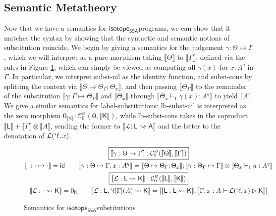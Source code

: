 \documentclass[acmsmall,screen,review]{acmart}
\newcommand{\mc}[1]{\ensuremath{\mathcal{#1}}}
\newcommand{\mb}[1]{\ensuremath{\mathbf{#1}}}
\newcommand{\ms}[1]{\ensuremath{\mathsf{#1}}}
\newcommand{\lbl}[1]{{`#1}}
\newcommand{\csplits}[3]{#1 \mapsto #2;#3}
\newcommand{\thyp}[3]{#1: {#2}^{#3}}
\newcommand{\lhyp}[3]{#1[#2](#3)}
\newcommand{\llhyp}[3]{\lhyp{\lbl{#1}}{#2}{#3}}
\newcommand{\rle}[1]{{\scriptsize\textsf{#1}}}
\newcommand{\hasty}[5]{#1 \vdash_{#2} #3: {#4}^{#5}}
\newcommand{\haslb}[3]{#1 \vdash #2 \rhd #3}
\newcommand{\issubst}[3]{#1: #2 \mapsto #3}
\newcommand{\lbsubst}[3]{#1: #2 \rightsquigarrow #3}
\newcommand{\dnt}[1]{\llbracket{#1}\rrbracket}
\newcommand{\isotopessa}{\ms{isotope_{SSA}}}
\begin{document}
\subsection{Semantic Metatheory}

Now that we have a semantics for \isotopessa programs, we can show that it
matches the syntax by showing that the syntactic and semantic notions of
substitution coincide. We begin by giving a semantics for the judgement
\(\issubst{\gamma}{\Theta}{\Gamma}\), which we will interpret as a pure morphism
taking \(\dnt{\Theta}\) to \(\dnt{\Gamma}\), defined via the rules in Figure
\ref{fig:ssa-subst-semantics}, which can simply be viewed as computing all
\(\gamma(x)\) for \(\thyp{x}{A}{q}\) in \(\Gamma\). In particular, we interpret
\rle{subst-nil} as the identity function, and \rle{subst-cons} by splitting the
context via \(\dnt{\csplits{\Theta}{\Theta_\Gamma}{\Theta_x}}\), and then
passing \(\dnt{\Theta_\Gamma}\) to the remainder of the substitution
\(\dnt{\issubst{\gamma}{\Gamma}{\Theta_\Gamma}}\) and \(\dnt{\Theta_x}\) through
\(\dnt{\hasty{\Theta_x}{1}{\gamma(x)}{A}{q}}\) to yield \(\dnt{A}\). We give a
similar semantics for label-substitutions: \rle{lb-subst-nil} is interpreted as
the zero morphism \(0_{\dnt{\ms{K}}}: \mc{C}_0^\varnothing(\mb{0},
\dnt{\ms{K}})\), while \rle{lb-subst-cons} takes in the coproduct \(\dnt{\ms{L}}
+ \dnt{\Gamma} \otimes \dnt{A}\), sending the former to
\(\dnt{\lbsubst{\mc{L}}{\ms{L}}{\ms{A}}}\) and the latter to the denotation of
\(\mc{L}(\lbl{\ell}, x)\).

\begin{figure}
  \begin{gather*}
    \boxed{\dnt{\issubst{\gamma}{\Theta}{\Gamma}}: \mc{C}_1^\varnothing(\dnt{\Theta}, \dnt{\Gamma})} 
    \\
    \dnt{\issubst{\cdot}{\cdot}{\cdot}} = \ms{id}
    \qquad
    \dnt{\issubst{\gamma}{\Theta}{\Gamma, \thyp{x}{A}{q}}}
      = \dnt{\csplits{\Theta}{\Theta_\Gamma}{\Theta_x}};\dnt{\issubst{\gamma}{\Theta_\Gamma}{\Gamma}} \otimes \dnt{\hasty{\Theta_x}{1}{a}{A}{q}}
    \\
    \boxed{\dnt{\lbsubst{\mc{L}}{\ms{L}}{\ms{K}}}: \mc{C}_0^\varnothing(\dnt{\ms{L}}, \dnt{\ms{K}})} 
    \\
    \dnt{\lbsubst{\mc{L}}{\cdot}{\ms{K}}} = 0_{\ms{K}}
    \qquad
    \dnt{\lbsubst{\mc{L}}{\ms{L}, \llhyp{\ell}{\Gamma}{A}}{\ms{K}}}
    = [\dnt{\lbsubst{\ms{L}}{\ms{L}}{\ms{K}}}, \dnt{\haslb{\Gamma, \thyp{x}{A}{}}{\mc{L}(\lbl{\ell}, x)}{\ms{K}}}]
  \end{gather*}
  \caption{Semantics for \isotopessa substitutions}
  \label{fig:ssa-subst-semantics}
\end{figure}
\end{document}
